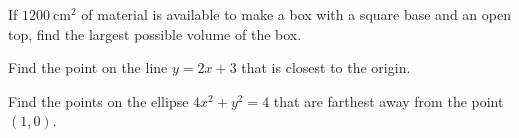 \documentclass[10pt]{amsart}
\begin{document}
\vspace{3in}

\begin{thm}
  If \(1200\ \text{cm}^2\) of material is available to make a box with a square base and an open top, find the largest possible volume of the box.
\end{thm}

\newpage

\begin{thm}
  Find the point on the line \(y = 2x + 3\) that is closest to the origin.
\end{thm}

\vspace{3in}

\begin{thm}
  Find the points on the ellipse \(4x^2 + y^2 = 4\) that are farthest away from the point \((1,0)\).
\end{thm}
\end{document}
